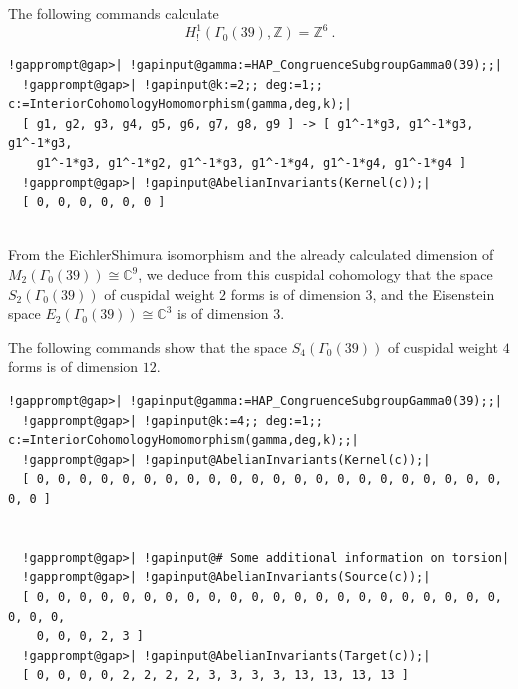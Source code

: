 \documentclass[a4paper,11pt]{report}
\begin{document}
{{ 

 The following commands calculate 
\[H^1_{!}(\Gamma_0(39),\mathbb Z) = \mathbb Z^6\ .\]
 
\begin{Verbatim}[commandchars=!@|,fontsize=\small,frame=single,label=Example]
  !gapprompt@gap>| !gapinput@gamma:=HAP_CongruenceSubgroupGamma0(39);;|
  !gapprompt@gap>| !gapinput@k:=2;; deg:=1;; c:=InteriorCohomologyHomomorphism(gamma,deg,k);|
  [ g1, g2, g3, g4, g5, g6, g7, g8, g9 ] -> [ g1^-1*g3, g1^-1*g3, g1^-1*g3, 
    g1^-1*g3, g1^-1*g2, g1^-1*g3, g1^-1*g4, g1^-1*g4, g1^-1*g4 ]
  !gapprompt@gap>| !gapinput@AbelianInvariants(Kernel(c));|
  [ 0, 0, 0, 0, 0, 0 ]
  
\end{Verbatim}
 From the Eichler\texttt{}Shimura isomorphism and the already
calculated dimension of $M_2(\Gamma_0(39))\cong \mathbb C^9$, we deduce from this cuspidal cohomology that the space $S_2(\Gamma_0(39))$ of cuspidal weight $2$ forms is of dimension $3$, and the Eisenstein space $E_2(\Gamma_0(39))\cong \mathbb C^3$ is of dimension $3$. 

The following commands show that the space $S_4(\Gamma_0(39))$ of cuspidal weight $4$ forms is of dimension $12$. 
\begin{Verbatim}[commandchars=!@|,fontsize=\small,frame=single,label=Example]
  !gapprompt@gap>| !gapinput@gamma:=HAP_CongruenceSubgroupGamma0(39);;|
  !gapprompt@gap>| !gapinput@k:=4;; deg:=1;; c:=InteriorCohomologyHomomorphism(gamma,deg,k);;|
  !gapprompt@gap>| !gapinput@AbelianInvariants(Kernel(c));|
  [ 0, 0, 0, 0, 0, 0, 0, 0, 0, 0, 0, 0, 0, 0, 0, 0, 0, 0, 0, 0, 0, 0, 0, 0 ]
  
  
  !gapprompt@gap>| !gapinput@# Some additional information on torsion|
  !gapprompt@gap>| !gapinput@AbelianInvariants(Source(c));|
  [ 0, 0, 0, 0, 0, 0, 0, 0, 0, 0, 0, 0, 0, 0, 0, 0, 0, 0, 0, 0, 0, 0, 0, 0, 0, 
    0, 0, 0, 2, 3 ]
  !gapprompt@gap>| !gapinput@AbelianInvariants(Target(c));|
  [ 0, 0, 0, 0, 2, 2, 2, 2, 3, 3, 3, 3, 13, 13, 13, 13 ]
  
\end{Verbatim}
 }

 
}
\end{document}

